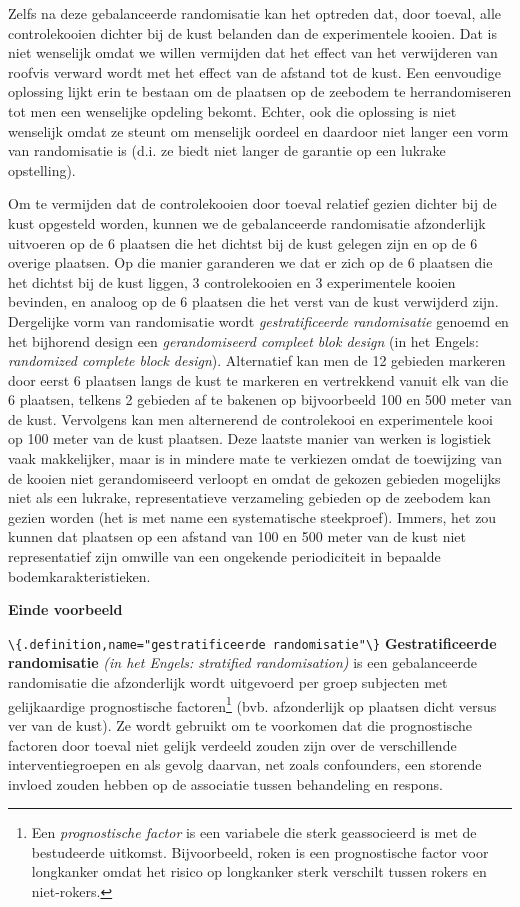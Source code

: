 \documentclass[
  12pt,dutch,coursenotes]{book}
\newcommand{\passthrough}[1]{#1}
\begin{document}
Zelfs na deze gebalanceerde randomisatie kan het optreden dat, door toeval, alle controlekooien dichter bij de kust belanden dan de experimentele kooien. Dat is niet wenselijk omdat we willen vermijden dat het effect van het verwijderen van roofvis verward wordt met het effect van de afstand tot de kust. Een eenvoudige oplossing lijkt erin te bestaan om de plaatsen op de zeebodem te herrandomiseren tot men een wenselijke opdeling bekomt. Echter, ook die oplossing is niet wenselijk omdat ze steunt om menselijk oordeel en daardoor niet langer een vorm van randomisatie is (d.i. ze biedt niet langer de garantie op een lukrake opstelling).

Om te vermijden dat de controlekooien door toeval relatief gezien dichter bij de kust opgesteld worden, kunnen we de gebalanceerde randomisatie afzonderlijk uitvoeren op de 6 plaatsen die het dichtst bij de kust gelegen zijn en op de 6 overige plaatsen. Op die manier garanderen we dat er zich op de 6 plaatsen die het dichtst bij de kust liggen, 3 controlekooien en 3 experimentele kooien bevinden, en analoog op de 6 plaatsen die het verst van de kust verwijderd zijn. Dergelijke vorm van randomisatie wordt \emph{gestratificeerde randomisatie}
genoemd en het bijhorend design een \emph{gerandomiseerd compleet blok design} (in het Engels: \emph{randomized complete block design}). Alternatief kan men de 12 gebieden markeren door eerst 6 plaatsen langs de kust te markeren en vertrekkend vanuit elk van die 6 plaatsen, telkens 2 gebieden af te bakenen op bijvoorbeeld 100 en 500 meter van de kust. Vervolgens kan men alternerend de controlekooi en experimentele kooi op 100 meter van de kust plaatsen. Deze laatste manier van werken is logistiek vaak makkelijker, maar is in mindere mate te verkiezen omdat de toewijzing van de kooien niet gerandomiseerd verloopt en omdat de gekozen gebieden mogelijks niet als een lukrake, representatieve verzameling gebieden op de zeebodem kan gezien worden (het is met name een systematische steekproef). Immers, het zou kunnen dat plaatsen op een afstand van 100 en 500 meter van de kust niet representatief zijn omwille van een ongekende periodiciteit in bepaalde bodemkarakteristieken.

\textbf{Einde voorbeeld}

\passthrough{\lstinline!\{.definition,name="gestratificeerde randomisatie"\}!}
\textbf{Gestratificeerde randomisatie} \emph{(in het Engels: stratified
randomisation)} is een gebalanceerde randomisatie die afzonderlijk wordt
uitgevoerd per groep subjecten met gelijkaardige prognostische factoren\footnote{Een \emph{prognostische factor} is een variabele die sterk geassocieerd is met de
  bestudeerde uitkomst. Bijvoorbeeld, roken is een prognostische factor voor
  longkanker omdat het risico op longkanker sterk verschilt tussen rokers en
  niet-rokers.}
(bvb. afzonderlijk op plaatsen dicht versus ver van de kust). Ze wordt gebruikt
om te voorkomen dat die prognostische factoren door toeval niet gelijk
verdeeld zouden zijn over de verschillende interventiegroepen en als gevolg
daarvan, net zoals confounders, een storende invloed zouden hebben op de
associatie tussen behandeling en respons.
\end{document}
